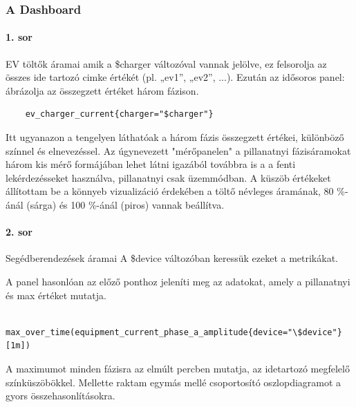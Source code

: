 \subsubsection{A Dashboard}
\paragraph{1. sor}
EV töltők áramai amik a
\$charger változóval vannak jelölve, ez felsorolja az összes ide  tartozó cimke értékét 
(pl. „ev1”, „ev2”, ...).
Ezután az idősoros panel: ábrázolja az összegzett értéket három fázison.
\begin{lstlisting}
    ev_charger_current{charger="$charger"}
\end{lstlisting}
Itt ugyanazon a tengelyen láthatóak a három fázis összegzett értékei, 
különböző színnel és elnevezéssel.
Az úgynevezett "mérőpanelen" a pillanatnyi fázisáramokat három kis mérő formájában
lehet látni igazából továbbra is a a fenti lekérdezésseket használva, 
pillanatnyi csak üzemmódban.
A küszöb értékeket állítottam be a könnyeb vizualizáció érdekében 
a töltő névleges áramának, 
80 \%-ánál (sárga) és 100 \%-ánál (piros) vannak beállítva.

\paragraph{2. sor}
Segédberendezések áramai
A \$device változóban keressük ezeket a metrikákat.

A panel hasonlóan az előző ponthoz jeleníti meg az adatokat, amely a pillanatnyi 
és max értéket mutatja.
\begin{lstlisting}
    max_over_time(equipment_current_phase_a_amplitude{device="\$device"}[1m])
\end{lstlisting}
A maximumot minden fázisra az elmúlt percben mutatja, az idetartozó 
megfelelő színküszöbökkel.
Mellette raktam egymás mellé csoportosító oszlopdiagramot a gyors 
összehasonlításokra.

